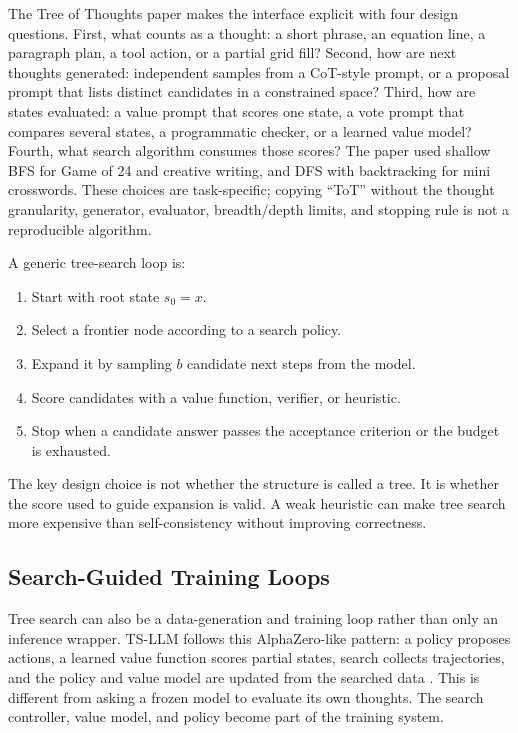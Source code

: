 The Tree of Thoughts paper makes the interface explicit with four design questions. First, what counts as a thought: a short phrase, an equation line, a paragraph plan, a tool action, or a partial grid fill? Second, how are next thoughts generated: independent samples from a CoT-style prompt, or a proposal prompt that lists distinct candidates in a constrained space? Third, how are states evaluated: a value prompt that scores one state, a vote prompt that compares several states, a programmatic checker, or a learned value model? Fourth, what search algorithm consumes those scores? The paper used shallow BFS for Game of 24 and creative writing, and DFS with backtracking for mini crosswords. These choices are task-specific; copying ``ToT'' without the thought granularity, generator, evaluator, breadth/depth limits, and stopping rule is not a reproducible algorithm.

A generic tree-search loop is:
\begin{enumerate}
    \item Start with root state $s_0=x$.
    \item Select a frontier node according to a search policy.
    \item Expand it by sampling $b$ candidate next steps from the model.
    \item Score candidates with a value function, verifier, or heuristic.
    \item Stop when a candidate answer passes the acceptance criterion or the budget is exhausted.
\end{enumerate}
The key design choice is not whether the structure is called a tree. It is whether the score used to guide expansion is valid. A weak heuristic can make tree search more expensive than self-consistency without improving correctness.

\subsection{Search-Guided Training Loops}
Tree search can also be a data-generation and training loop rather than only an inference wrapper. TS-LLM follows this AlphaZero-like pattern: a policy proposes actions, a learned value function scores partial states, search collects trajectories, and the policy and value model are updated from the searched data \cite{wan2024alphazero}. This is different from asking a frozen model to evaluate its own thoughts. The search controller, value model, and policy become part of the training system.

